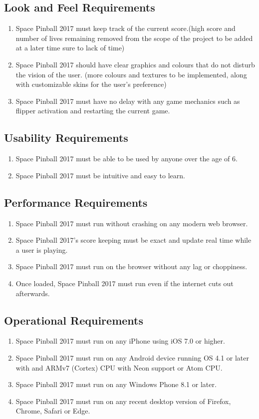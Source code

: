 \documentclass[12pt]{article}
\begin{document}
	\subsection{Look and Feel Requirements}
		\begin{enumerate}

\item Space Pinball 2017 must keep track of the current score.(high score and number of lives remaining removed from the scope of the project to be added at a later time sure to lack of time)
\item Space Pinball 2017 should have clear graphics and colours that do not disturb the vision of the user. (more colours and textures to be implemented, along with customizable skins for the user's preference)
\item Space Pinball 2017 must have no delay with any game mechanics such as flipper activation and restarting the current game.
		\end{enumerate}
	\subsection{Usability Requirements }
		\begin{enumerate}
\item Space Pinball 2017 must be able to be used by anyone over the age of 6.
\item Space Pinball 2017 must be intuitive and easy to learn.
		\end{enumerate}
		
	\subsection{Performance Requirements}
		\begin{enumerate}
\item Space Pinball 2017 must run without crashing on any modern web browser.
\item Space Pinball 2017's score keeping must be exact and update real time while a user is playing.
\item Space Pinball 2017 must run on the browser without any lag or choppiness.
\item Once loaded, Space Pinball 2017 must run even if the internet cuts out afterwards.

		\end{enumerate}
	\subsection{Operational Requirements}
		\begin{enumerate}

\item Space Pinball 2017 must run on any iPhone using iOS 7.0 or higher.
\item Space Pinball 2017 must run on any Android device running OS 4.1 or later with and ARMv7 (Cortex) CPU with Neon support or Atom CPU.
\item Space Pinball 2017 must run on any Windows Phone 8.1 or later. 
\item Space Pinball 2017 must run on any recent desktop version of Firefox, Chrome, Safari or Edge.
		\end{enumerate}
\end{document}
